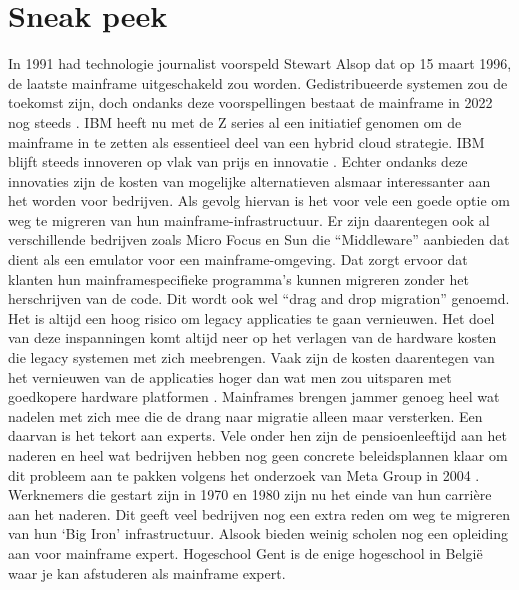 
\section{Sneak peek}
\label{sec:state-of-the-art}
In 1991 had technologie journalist voorspeld Stewart Alsop dat op 15 maart 1996, de laatste mainframe uitgeschakeld zou worden. Gedistribueerde systemen zou de toekomst zijn, doch ondanks deze voorspellingen bestaat de mainframe in 2022 nog steeds \autocite{Barnett2005}. IBM heeft nu met de Z series al een initiatief genomen om de mainframe in te zetten als essentieel deel van een hybrid cloud strategie. IBM blijft steeds innoveren op vlak van prijs en innovatie \autocite{Smolaks2021}. Echter ondanks deze innovaties zijn de kosten van mogelijke alternatieven alsmaar interessanter aan het worden voor bedrijven. Als gevolg hiervan is het voor vele een goede optie om weg te migreren van hun mainframe-infrastructuur. Er zijn daarentegen ook al verschillende bedrijven zoals Micro Focus en Sun die “Middleware” aanbieden dat dient als een emulator voor een mainframe-omgeving. Dat zorgt ervoor dat klanten hun mainframespecifieke programma’s kunnen migreren zonder het herschrijven van de code. Dit wordt ook wel “drag and drop migration” genoemd. Het is altijd een hoog risico om legacy applicaties te gaan vernieuwen. Het doel van deze inspanningen komt altijd neer op het verlagen van de hardware kosten die legacy systemen met zich meebrengen. Vaak zijn de kosten daarentegen van het vernieuwen van de applicaties hoger dan wat men zou uitsparen met goedkopere hardware platformen \autocite{Bingell2014}. Mainframes brengen jammer genoeg heel wat nadelen met zich mee die de drang naar migratie alleen maar versterken. Een daarvan is het tekort aan experts. Vele onder hen zijn de pensioenleeftijd aan het naderen en heel wat bedrijven hebben nog geen concrete beleidsplannen klaar om dit probleem aan te pakken volgens het onderzoek van Meta Group in 2004 \autocite{Bakker2006}. Werknemers die gestart zijn in 1970 en 1980 zijn nu het einde van hun carrière aan het naderen. Dit geeft veel bedrijven nog een extra reden om weg te migreren van hun ‘Big Iron’ infrastructuur. Alsook bieden weinig scholen nog een opleiding aan voor mainframe expert. Hogeschool Gent is de enige hogeschool in België waar je kan afstuderen als mainframe expert.

 

